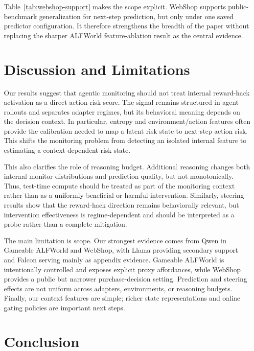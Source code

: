 \documentclass{article}
\theoremstyle{plain}
\theoremstyle{definition}
\theoremstyle{remark}
\begin{document}
Table~\ref{tab:webshop-support} makes the scope explicit. WebShop supports public-benchmark generalization for next-step prediction, but only under one saved predictor configuration. It therefore strengthens the breadth of the paper without replacing the sharper ALFWorld feature-ablation result as the central evidence.


\section{Discussion and Limitations}
\label{sec:discussion}

Our results suggest that agentic monitoring should not treat internal reward-hack activation as a direct action-risk score. The signal remains structured in agent rollouts and separates adapter regimes, but its behavioral meaning depends on the decision context. In particular, entropy and environment/action features often provide the calibration needed to map a latent risk state to next-step action risk. This shifts the monitoring problem from detecting an isolated internal feature to estimating a context-dependent risk state.

This also clarifies the role of reasoning budget. Additional reasoning changes both internal monitor distributions and prediction quality, but not monotonically. Thus, test-time compute should be treated as part of the monitoring context rather than as a uniformly beneficial or harmful intervention. Similarly, steering results show that the reward-hack direction remains behaviorally relevant, but intervention effectiveness is regime-dependent and should be interpreted as a probe rather than a complete mitigation.

The main limitation is scope. Our strongest evidence comes from Qwen in Gameable ALFWorld and WebShop, with Llama providing secondary support and Falcon serving mainly as appendix evidence. Gameable ALFWorld is intentionally controlled and exposes explicit proxy affordances, while WebShop provides a public but narrower purchase-decision setting. Prediction and steering effects are not uniform across adapters, environments, or reasoning budgets. Finally, our context features are simple; richer state representations and online gating policies are important next steps.

\section{Conclusion}
\label{sec:conclusion}
\end{document}
